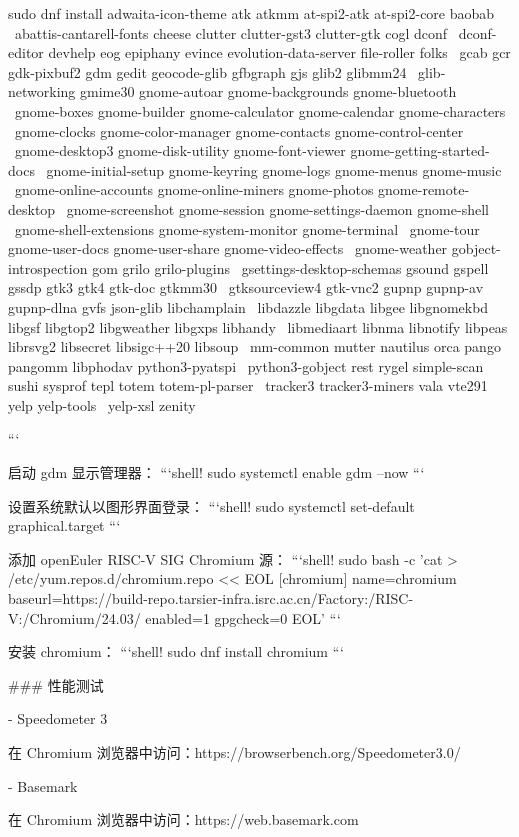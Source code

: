 \documentclass{article}
\begin{document}
\begin{markdown}
sudo dnf install adwaita-icon-theme atk atkmm at-spi2-atk at-spi2-core baobab \
 abattis-cantarell-fonts cheese clutter clutter-gst3 clutter-gtk cogl dconf \
 dconf-editor devhelp eog epiphany evince evolution-data-server file-roller folks \
 gcab gcr gdk-pixbuf2 gdm gedit geocode-glib gfbgraph gjs glib2 glibmm24 \
 glib-networking gmime30 gnome-autoar gnome-backgrounds gnome-bluetooth \
 gnome-boxes gnome-builder gnome-calculator gnome-calendar gnome-characters \
 gnome-clocks gnome-color-manager gnome-contacts gnome-control-center \
 gnome-desktop3 gnome-disk-utility gnome-font-viewer gnome-getting-started-docs \
 gnome-initial-setup gnome-keyring gnome-logs gnome-menus gnome-music \
 gnome-online-accounts gnome-online-miners gnome-photos gnome-remote-desktop \
 gnome-screenshot gnome-session gnome-settings-daemon gnome-shell \
 gnome-shell-extensions gnome-system-monitor gnome-terminal \
 gnome-tour gnome-user-docs gnome-user-share gnome-video-effects \
 gnome-weather gobject-introspection gom grilo grilo-plugins \
 gsettings-desktop-schemas gsound gspell gssdp gtk3 gtk4 gtk-doc gtkmm30 \
 gtksourceview4 gtk-vnc2 gupnp gupnp-av gupnp-dlna gvfs json-glib libchamplain \
 libdazzle libgdata libgee libgnomekbd libgsf libgtop2 libgweather libgxps libhandy \
 libmediaart libnma libnotify libpeas librsvg2 libsecret libsigc++20 libsoup \
 mm-common mutter nautilus orca pango pangomm libphodav python3-pyatspi \
 python3-gobject rest rygel simple-scan sushi sysprof tepl totem totem-pl-parser \
 tracker3 tracker3-miners vala vte291 yelp yelp-tools \
 yelp-xsl zenity

```

启动 gdm 显示管理器：
```shell!
sudo systemctl enable gdm --now
```

设置系统默认以图形界面登录：
```shell!
sudo systemctl set-default graphical.target
```

添加 openEuler RISC-V SIG Chromium 源：
```shell!
sudo bash -c 'cat > /etc/yum.repos.d/chromium.repo << EOL
[chromium]
name=chromium
baseurl=https://build-repo.tarsier-infra.isrc.ac.cn/Factory:/RISC-V:/Chromium/24.03/
enabled=1
gpgcheck=0
EOL'
```

安装 chromium：
```shell!
sudo dnf install chromium
```

### 性能测试

- Speedometer 3

在 Chromium 浏览器中访问：https://browserbench.org/Speedometer3.0/

- Basemark

在 Chromium 浏览器中访问：https://web.basemark.com


\end{markdown}
\end{document}
